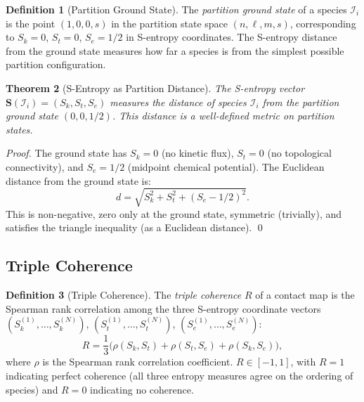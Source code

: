 \documentclass[11pt,twocolumn]{article}
\theoremstyle{plain}
\newtheorem{theorem}{Theorem}[section]
\theoremstyle{definition}
\newtheorem{definition}[theorem]{Definition}
\newcommand{\Sk}{S_k}
\newcommand{\St}{S_t}
\newcommand{\Se}{S_e}
\newcommand{\bS}{\mathbf{S}}
\begin{document}
\begin{definition}[Partition Ground State]
\label{def:ground_state}
The \emph{partition ground state} of a species $\mathcal{I}_i$ is the point
$(1, 0, 0, s)$ in the partition state space $(n, \ell, m, s)$, corresponding to
$\Sk = 0$, $\St = 0$, $\Se = 1/2$ in S-entropy coordinates. The S-entropy
distance from the ground state measures how far a species is from the simplest
possible partition configuration.
\end{definition}

\begin{theorem}[S-Entropy as Partition Distance]
\label{thm:partition_distance}
The S-entropy vector $\bS(\mathcal{I}_i) = (\Sk, \St, \Se)$ measures the
distance of species $\mathcal{I}_i$ from the partition ground state
$(0, 0, 1/2)$. This distance is a well-defined metric on partition states.
\end{theorem}

\begin{proof}
The ground state has $\Sk = 0$ (no kinetic flux), $\St = 0$ (no topological
connectivity), and $\Se = 1/2$ (midpoint chemical potential). The Euclidean
distance from the ground state is:
\[
  d = \sqrt{\Sk^2 + \St^2 + (\Se - 1/2)^2}.
\]
This is non-negative, zero only at the ground state, symmetric (trivially), and
satisfies the triangle inequality (as a Euclidean distance). \qed
\end{proof}

\subsection{Triple Coherence}

\begin{definition}[Triple Coherence]
\label{def:triple_coherence}
The \emph{triple coherence} $R$ of a contact map is the Spearman rank
correlation \cite{spearman1904proof} among the three S-entropy coordinate
vectors $(\Sk^{(1)}, \ldots, \Sk^{(N)})$, $(\St^{(1)}, \ldots, \St^{(N)})$,
$(\Se^{(1)}, \ldots, \Se^{(N)})$:
\begin{equation}\label{eq:coherence}
  R = \frac{1}{3}\bigl(
    \rho(\Sk, \St) + \rho(\St, \Se) + \rho(\Sk, \Se)
  \bigr),
\end{equation}
where $\rho$ is the Spearman rank correlation coefficient. $R \in [-1, 1]$,
with $R = 1$ indicating perfect coherence (all three entropy measures agree on
the ordering of species) and $R = 0$ indicating no coherence.
\end{definition}
\end{document}
